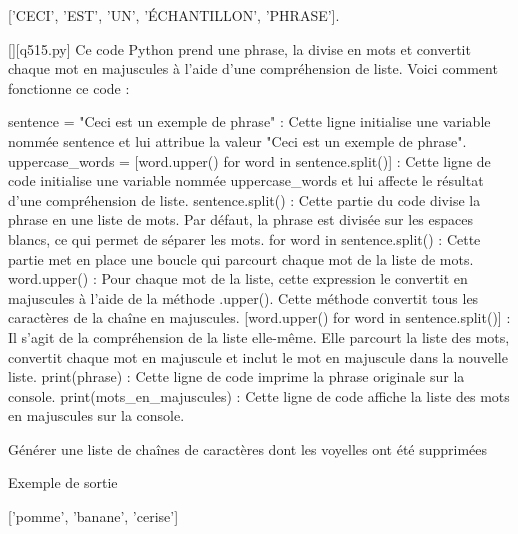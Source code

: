['CECI', 'EST', 'UN', 'ÉCHANTILLON', 'PHRASE'].
        \par
        \begin{solution}
            \renewcommand{\nomfichier}{q515.py}
            \pythonfile{\chemincode \nomfichier}[][\nomfichier]
            Ce code Python prend une phrase, la divise en mots et convertit chaque mot en majuscules à l'aide d'une compréhension de liste. Voici comment fonctionne ce code :

    sentence = "Ceci est un exemple de phrase" : Cette ligne initialise une variable nommée sentence et lui attribue la valeur "Ceci est un exemple de phrase".
    uppercase\_words = [word.upper() for word in sentence.split()] : Cette ligne de code initialise une variable nommée uppercase\_words et lui affecte le résultat d'une compréhension de liste.
        sentence.split() : Cette partie du code divise la phrase en une liste de mots. Par défaut, la phrase est divisée sur les espaces blancs, ce qui permet de séparer les mots.
        for word in sentence.split() : Cette partie met en place une boucle qui parcourt chaque mot de la liste de mots.
        word.upper() : Pour chaque mot de la liste, cette expression le convertit en majuscules à l'aide de la méthode .upper(). Cette méthode convertit tous les caractères de la chaîne en majuscules.
        [word.upper() for word in sentence.split()] : Il s'agit de la compréhension de la liste elle-même. Elle parcourt la liste des mots, convertit chaque mot en majuscule et inclut le mot en majuscule dans la nouvelle liste.
    print(phrase) : Cette ligne de code imprime la phrase originale sur la console.
    print(mots\_en\_majuscules) : Cette ligne de code affiche la liste des mots en majuscules sur la console.
        \end{solution}
        

        \question
        Générer une liste de chaînes de caractères dont les voyelles ont été supprimées

Exemple de sortie

['pomme', 'banane', 'cerise']

